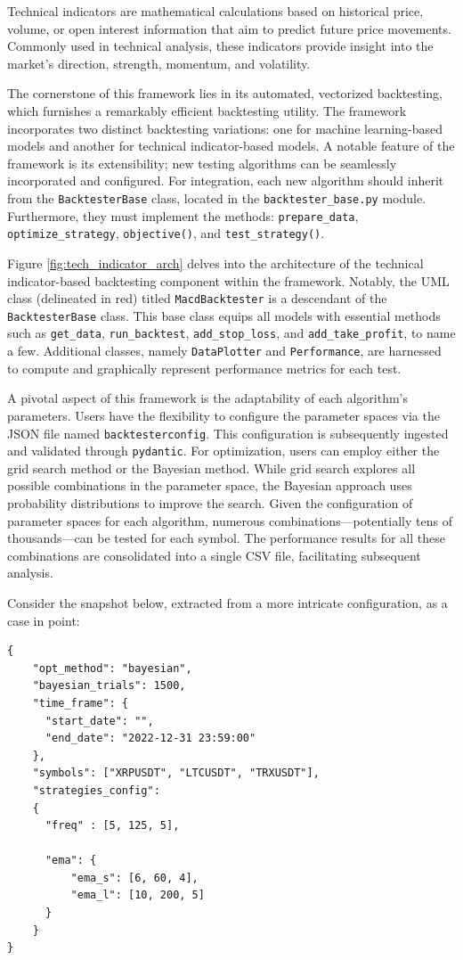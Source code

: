 \noindent
Technical indicators are mathematical calculations based on historical price, volume, or open interest information that aim to predict future price movements.
Commonly used in technical analysis, these indicators provide insight into the market's direction, strength, momentum, and volatility.

The cornerstone of this framework lies in its automated, vectorized backtesting, which furnishes a remarkably efficient backtesting utility.
The framework incorporates two distinct backtesting variations: one for machine learning-based models and another for technical indicator-based models.
A notable feature of the framework is its extensibility; new testing algorithms can be seamlessly incorporated and configured.
For integration, each new algorithm should inherit from the \texttt{BacktesterBase} class, located in the \texttt{backtester\_base.py} module.
Furthermore, they must implement the methods: \texttt{prepare\_data}, \texttt{optimize\_strategy}, \texttt{objective()}, and \texttt{test\_strategy()}.

Figure \ref{fig:tech_indicator_arch} delves into the architecture of the technical indicator-based backtesting component within the framework.
Notably, the UML class (delineated in red) titled \texttt{MacdBacktester} is a descendant of the \texttt{BacktesterBase} class.
This base class equips all models with essential methods such as \texttt{get\_data}, \texttt{run\_backtest}, \texttt{add\_stop\_loss}, and \texttt{add\_take\_profit}, to name a few.
Additional classes, namely \texttt{DataPlotter} and \texttt{Performance}, are harnessed to compute and graphically represent performance metrics for each test.

A pivotal aspect of this framework is the adaptability of each algorithm's parameters.
Users have the flexibility to configure the parameter spaces via the JSON file named \texttt{backtesterconfig}.
This configuration is subsequently ingested and validated through \texttt{pydantic}.
For optimization, users can employ either the grid search method or the Bayesian method.
While grid search explores all possible combinations in the parameter space, the Bayesian approach uses probability distributions to improve the search.
Given the configuration of parameter spaces for each algorithm, numerous combinations---potentially tens of thousands---can be tested for each symbol.
The performance results for all these combinations are consolidated into a single CSV file, facilitating subsequent analysis.

Consider the snapshot below, extracted from a more intricate configuration, as a case in point:
\begin{verbatim}
{
    "opt_method": "bayesian",
    "bayesian_trials": 1500,
    "time_frame": {
      "start_date": "",
      "end_date": "2022-12-31 23:59:00"
    },
    "symbols": ["XRPUSDT", "LTCUSDT", "TRXUSDT"],
    "strategies_config":
    {
      "freq" : [5, 125, 5],

      "ema": {
          "ema_s": [6, 60, 4],
          "ema_l": [10, 200, 5]
      }
    }
}
\end{verbatim}

